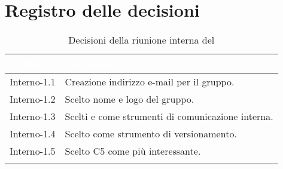 \section{Registro delle decisioni}
{
\renewcommand{\arraystretch}{1.5}
\centering
\begin{longtable}{C{3cm} C{9cm}}
\textcolor{white}{\textbf{Codice}}&
\textcolor{white}{\textbf{Decisione}}\\	
\endhead
		
Interno-1.1 & Creazione indirizzo e-mail per il gruppo.\\

Interno-1.2 & Scelto nome e logo del gruppo.\\

Interno-1.3 & Scelti  e  come strumenti di comunicazione interna.\\

Interno-1.4 & Scelto  come strumento di versionamento.\\

Interno-1.5 & Scelto C5 come  più interessante.\\
		
\caption{Decisioni della riunione interna del \Data{}}		
\end{longtable}
}
